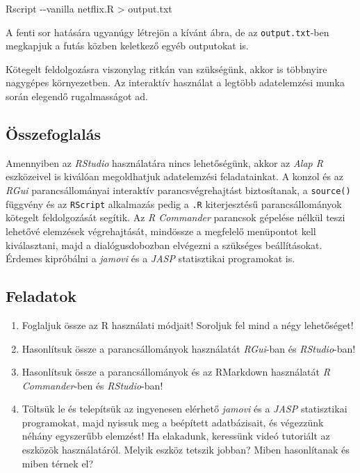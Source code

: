 \documentclass[
]{book}
\makeatletter
\newenvironment{Shaded}{\begin{snugshade}}{\end{snugshade}}
\newcommand{\NormalTok}[1]{#1}
\providecommand{\tightlist}{%
  \setlength{\itemsep}{0pt}\setlength{\parskip}{0pt}}
\newenvironment{kframe}{%
\medskip{}
\setlength{\fboxsep}{.8em}
 \def\at@end@of@kframe{}%
 \ifinner\ifhmode%
  \def\at@end@of@kframe{\end{minipage}}%
  \begin{minipage}{\columnwidth}%
 \fi\fi%
 \def\FrameCommand##1{\hskip\@totalleftmargin \hskip-\fboxsep
 \colorbox{shadecolor}{##1}\hskip-\fboxsep
     \hskip-\linewidth \hskip-\@totalleftmargin \hskip\columnwidth}%
 \MakeFramed {\advance\hsize-\width
   \@totalleftmargin\z@ \linewidth\hsize
   \@setminipage}}%
 {\par\unskip\endMakeFramed%
 \at@end@of@kframe}
\newenvironment{rmdblock}[1]
  {
  \begin{itemize}
  \renewcommand{\labelitemi}{
    \raisebox{-.7\height}[0pt][0pt]{
      {\setkeys{Gin}{width=3em,keepaspectratio}\texttt{[image: images/\#1]}}
    }
  }
  \setlength{\fboxsep}{1em}
  \begin{kframe}
  \item
  }
  {
  \end{kframe}
  \end{itemize}
  }
\newenvironment{rmdsummary}
  {\begin{rmdblock}{summary}}
  {\end{rmdblock}}
\newenvironment{rmdexercise}
  {\begin{rmdblock}{exercise}}
  {\end{rmdblock}}
\makeatother
\begin{document}
\begin{Shaded}
\begin{Highlighting}[]
\NormalTok{Rscript {-}{-}vanilla netflix.R \textgreater{} output.txt}
\end{Highlighting}
\end{Shaded}

A fenti sor hatására ugyanúgy létrejön a kívánt ábra, de az \texttt{output.txt}-ben megkapjuk a futás közben keletkező egyéb outputokat is.

Kötegelt feldolgozásra viszonylag ritkán van szükségünk, akkor is többnyire nagygépes környezetben. Az interaktív használat a legtöbb adatelemzési munka során elegendő rugalmasságot ad.

\hypertarget{munka-az-r-ben-3-summary}{%
\subsection{Összefoglalás}\label{munka-az-r-ben-3-summary}}

\begin{rmdsummary}
Amennyiben az \emph{RStudio} használatára nincs lehetőségünk, akkor az
\emph{Alap R} eszközeivel is kiválóan megoldhatjuk adatelemzési
feladatainkat. A konzol és az \emph{RGui} parancsállományai interaktív
parancsvégrehajtást biztosítanak, a \texttt{source()} függvény és az
\texttt{RScript} alkalmazás pedig a \texttt{.R} kiterjesztésű
parancsállományok kötegelt feldolgozását segítik. Az \emph{R Commander}
parancsok gépelése nélkül teszi lehetővé elemzések végrehajtását,
mindössze a megfelelő menüpontot kell kiválasztani, majd a
dialógusdobozban elvégezni a szükséges beállításokat. Érdemes kipróbálni
a \emph{jamovi} és a \emph{JASP} statisztikai programokat is.
\end{rmdsummary}

\hypertarget{munka-az-r-ben-3-exercise}{%
\subsection{Feladatok}\label{munka-az-r-ben-3-exercise}}

\begin{rmdexercise}
\begin{enumerate}
\def\labelenumi{\arabic{enumi}.}
\tightlist
\item
  Foglaljuk össze az R használati módjait! Soroljuk fel mind a négy lehetőséget!
\item
  Hasonlítsuk össze a parancsállományok használatát \emph{RGui}-ban és \emph{RStudio}-ban!
\item
  Hasonlítsuk össze a parancsállományok és az RMarkdown használatát \emph{R Commander}-ben és \emph{RStudio}-ban!
\item
  Töltsük le és telepítsük az ingyenesen elérhető \emph{jamovi} és a \emph{JASP} statisztikai programokat, majd nyissuk meg a beépített adatbázisait, és végezzünk néhány egyszerűbb elemzést! Ha elakadunk, keressünk videó tutoriált az eszközök használatáról. Melyik eszköz tetszik jobban? Miben hasonlítanak és miben térnek el?
\end{enumerate}
\end{rmdexercise}
\end{document}
